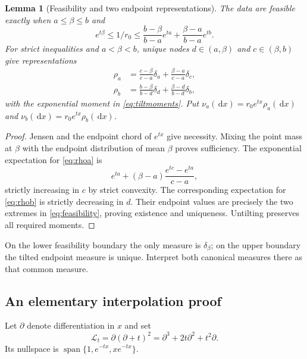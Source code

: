 \documentclass[11pt]{article}
\numberwithin{equation}{section}
\newtheorem{lemma}[lemma]{Lemma}
\theoremstyle{definition}
\theoremstyle{remark}
\newcommand{\Span}{\operatorname{span}}
\newcommand{\dd}{\,\mathrm d}
\begin{document}
\begin{lemma}[Feasibility and two endpoint representations]\label{lem:feasible}
The data are feasible exactly when $a\le\beta\le b$ and
\begin{equation}\label{eq:feasibility}
 e^{t\beta}\le1/r_0\le
 \frac{b-\beta}{b-a}e^{ta}+\frac{\beta-a}{b-a}e^{tb}.
\end{equation}
For strict inequalities and $a<\beta<b$, unique nodes $d\in(a,\beta)$ and $c\in(\beta,b)$ give representations
\begin{align}
 \rho_a&=\frac{c-\beta}{c-a}\delta_a+
          \frac{\beta-a}{c-a}\delta_c,\label{eq:rhoa}\\
 \rho_b&=\frac{b-\beta}{b-d}\delta_d+
          \frac{\beta-d}{b-d}\delta_b,\label{eq:rhob}
\end{align}
with the exponential moment in \eqref{eq:tiltmoments}. Put $\nu_a(\dd x)=r_0e^{tx}\rho_a(\dd x)$ and $\nu_b(\dd x)=r_0e^{tx}\rho_b(\dd x)$.
\end{lemma}
\begin{proof}
Jensen and the endpoint chord of $e^{tx}$ give necessity. Mixing the point mass at $\beta$ with the endpoint distribution of mean $\beta$ proves sufficiency. The exponential expectation for \eqref{eq:rhoa} is
\[
 e^{ta}+(\beta-a)\frac{e^{tc}-e^{ta}}{c-a},
\]
strictly increasing in $c$ by strict convexity. The corresponding expectation for \eqref{eq:rhob} is strictly decreasing in $d$. Their endpoint values are precisely the two extremes in \eqref{eq:feasibility}, proving existence and uniqueness. Untilting preserves all required moments.
\end{proof}
On the lower feasibility boundary the only measure is $\delta_\beta$; on the upper boundary the tilted endpoint measure is unique. Interpret both canonical measures there as that common measure.

\subsection{An elementary interpolation proof}
Let $\partial$ denote differentiation in $x$ and set
\begin{equation}\label{eq:operator}
 \mathcal L_t=\partial(\partial+t)^2
 =\partial^3+2t\partial^2+t^2\partial.
\end{equation}
Its nullspace is $\Span\{1,e^{-tx},xe^{-tx}\}$.
\end{document}
